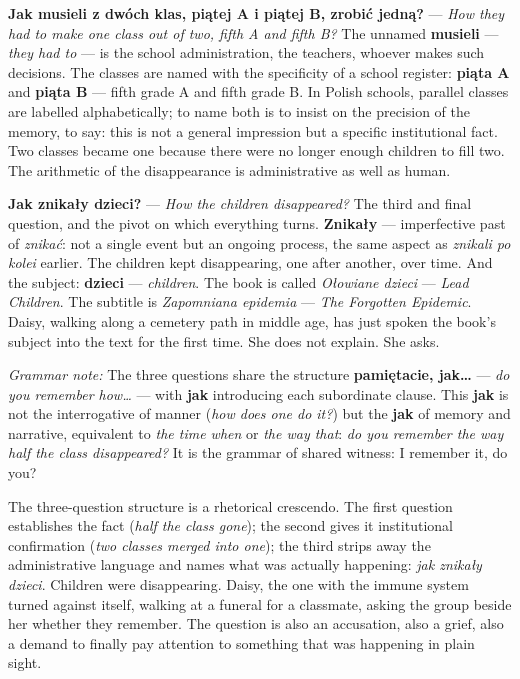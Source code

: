 \textbf{Jak musieli z dwóch klas, piątej A i piątej B,
zrobić jedną?} --- \textit{How they had to make one
class out of two, fifth A and fifth B?} The unnamed
\textbf{musieli} --- \textit{they had to} --- is the
school administration, the teachers, whoever makes
such decisions. The classes are named with the
specificity of a school register: \textbf{piąta A}
and \textbf{piąta B} --- fifth grade A and fifth grade
B. In Polish schools, parallel classes are labelled
alphabetically; to name both is to insist on the
precision of the memory, to say: this is not a general
impression but a specific institutional fact. Two
classes became one because there were no longer enough
children to fill two. The arithmetic of the
disappearance is administrative as well as human.

\textbf{Jak znikały dzieci?} --- \textit{How the
children disappeared?} The third and final question,
and the pivot on which everything turns.
\textbf{Znikały} --- imperfective past of
\textit{znikać}: not a single event but an ongoing
process, the same aspect as \textit{znikali po kolei}
earlier. The children kept disappearing, one after
another, over time. And the subject: \textbf{dzieci}
--- \textit{children}. The book is called
\textit{Ołowiane dzieci} --- \textit{Lead Children}.
The subtitle is \textit{Zapomniana epidemia} ---
\textit{The Forgotten Epidemic}. Daisy, walking along
a cemetery path in middle age, has just spoken the
book's subject into the text for the first time.
She does not explain. She asks.

\medskip
\noindent\textit{Grammar note:} The three questions
share the structure \textbf{pamiętacie, jak\ldots{}}
--- \textit{do you remember how\ldots{}} --- with
\textbf{jak} introducing each subordinate clause.
This \textbf{jak} is not the interrogative of manner
(\textit{how does one do it?}) but the \textbf{jak}
of memory and narrative, equivalent to \textit{the
time when} or \textit{the way that}: \textit{do you
remember the way half the class disappeared?} It is
the grammar of shared witness: I remember it, do you?

\medskip
The three-question structure is a rhetorical
crescendo. The first question establishes the fact
(\textit{half the class gone}); the second gives it
institutional confirmation (\textit{two classes
merged into one}); the third strips away the
administrative language and names what was actually
happening: \textit{jak znikały dzieci}. Children
were disappearing. Daisy, the one with the immune
system turned against itself, walking at a funeral
for a classmate, asking the group beside her whether
they remember. The question is also an accusation,
also a grief, also a demand to finally pay attention
to something that was happening in plain sight.

